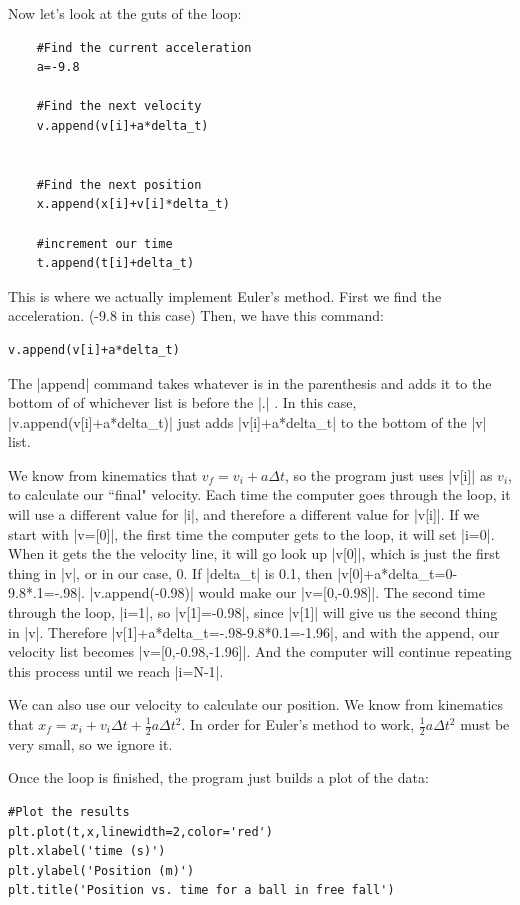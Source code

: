 \documentclass{book}
\begin{document}
Now let's look at the guts of the loop:
\begin{lstlisting}
    #Find the current acceleration
    a=-9.8
    
    #Find the next velocity
    v.append(v[i]+a*delta_t)    
    
    
    #Find the next position
    x.append(x[i]+v[i]*delta_t)
    
    #increment our time
    t.append(t[i]+delta_t)
\end{lstlisting}

This is where we actually implement Euler's method.  First we find the acceleration. (-9.8 in this case) Then, we have this command:
\begin{lstlisting}
v.append(v[i]+a*delta_t)
\end{lstlisting}
The |append| command takes whatever is in the parenthesis and adds it to the bottom of of whichever list is before the |.| . In this case, |v.append(v[i]+a*delta_t)| just adds |v[i]+a*delta_t| to the bottom of the |v| list.  
  
We know from kinematics that $v_f=v_i+a\Delta t$, so the program just uses |v[i]| as $v_i$, to calculate our ``final" velocity.  Each time the computer goes through the loop, it will use a different value for |i|, and therefore a different value for |v[i]|.  
If we start with |v=[0]|, the first time the computer gets to the loop, it will set |i=0|.  When it gets the the velocity line, it will go look up |v[0]|, which is just the first thing in |v|, or in our case, 0.  If |delta_t| is 0.1, then |v[0]+a*delta_t=0-9.8*.1=-.98|.  |v.append(-0.98)| would make our |v=[0,-0.98]|.  The second time through the loop, |i=1|, so |v[1]=-0.98|, since |v[1]| will give us the second thing in |v|.  Therefore |v[1]+a*delta_t=-.98-9.8*0.1=-1.96|, and with the append, our velocity list becomes |v=[0,-0.98,-1.96]|.  And the computer will continue repeating this process until we reach |i=N-1|.

We can also use our velocity to calculate our position.  We know from kinematics that $x_f=x_i+v_i\Delta t+\frac{1}{2}a\Delta t^2$.  In order for Euler's method to work, $\frac{1}{2}a\Delta t^2$ must be very small, so we ignore it.

Once the loop is finished, the program just builds a plot of the data:
\begin{lstlisting}
#Plot the results
plt.plot(t,x,linewidth=2,color='red')
plt.xlabel('time (s)')
plt.ylabel('Position (m)')
plt.title('Position vs. time for a ball in free fall')
\end{lstlisting}
\end{document}
